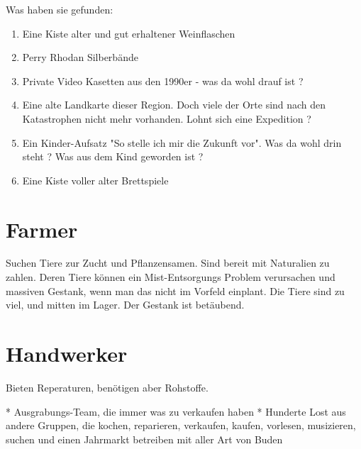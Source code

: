 Was haben sie gefunden:

\begin{enumerate}
    \item Eine Kiste alter und gut erhaltener Weinflaschen
    \item Perry Rhodan Silberbände
    \item Private Video Kasetten aus den 1990er - was da wohl drauf ist ?
    \item Eine alte Landkarte dieser Region. Doch viele der Orte sind nach den Katastrophen nicht mehr vorhanden. Lohnt sich eine Expedition ?
    \item Ein Kinder-Aufsatz "So stelle ich mir die Zukunft vor". Was da wohl drin steht ? Was aus dem Kind geworden ist ?
    \item Eine Kiste voller alter Brettspiele
\end{enumerate}

\section{Farmer}

Suchen Tiere zur Zucht und Pflanzensamen. Sind bereit mit Naturalien zu zahlen. Deren Tiere können ein Mist-Entsorgungs Problem verursachen und massiven Gestank, wenn man das nicht im Vorfeld einplant. Die Tiere sind zu viel, und mitten im Lager. Der Gestank ist betäubend.


\section{Handwerker}

Bieten Reperaturen, benötigen aber Rohstoffe.


* Ausgrabungs-Team, die immer was zu verkaufen haben
* Hunderte Lost aus andere Gruppen, die kochen, reparieren, verkaufen, kaufen, vorlesen, musizieren, suchen und einen Jahrmarkt betreiben mit aller Art von Buden

